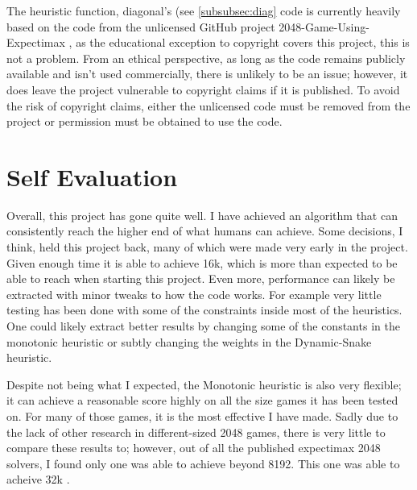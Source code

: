 \documentclass{article}
\begin{document}
The heuristic function, diagonal's (see \ref{subsubsec:diag} code is currently heavily based on the code from the unlicensed GitHub project 2048-Game-Using-Expectimax \cite{expectimax2048}, as the educational exception to copyright covers this project, this is not a problem. From an ethical perspective, as long as the code remains publicly available and isn't used commercially, there is unlikely to be an issue; however, it does leave the project vulnerable to copyright claims if it is published. To avoid the risk of copyright claims, either the unlicensed code must be removed from the project or permission must be obtained to use the code.
\section{Self Evaluation}
Overall, this project has gone quite well. I have achieved an algorithm that can consistently reach the higher end of what humans can achieve. Some decisions, I think, held this project back, many of which were made very early in the project. Given enough time it is able to achieve 16k, which is more than expected to be able to reach when starting this project. Even more, performance can likely be extracted with minor tweaks to how the code works. For example very little testing has been done with some of the constraints inside most of the heuristics. One could likely extract better results by changing some of the constants in the monotonic heuristic or subtly changing the weights in the Dynamic-Snake heuristic.

Despite not being what I expected, the Monotonic heuristic is also very flexible; it can achieve a reasonable score highly on all the size games it has been tested on. For many of those games, it is the most effective I have made. Sadly due to the lack of other research in different-sized 2048 games, there is very little to compare these results to; however, out of all the published expectimax 2048 solvers, I found only one was able to achieve beyond 8192. This one was able to acheive 32k \cite{_16k2048ai}.
\end{document}

